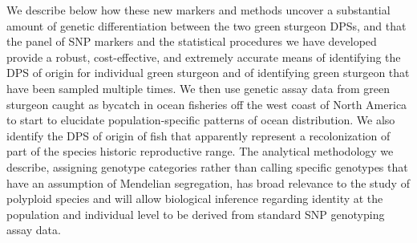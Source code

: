 We describe below how these new markers and methods uncover a substantial amount
of genetic differentiation between the two green sturgeon DPSs, and that the
panel of SNP markers and the statistical procedures we have developed provide a
robust, cost-effective, and extremely accurate means of identifying the DPS of
origin for individual green sturgeon and of identifying green sturgeon that have
been sampled multiple times. We then use genetic assay data from green sturgeon
caught as bycatch in ocean fisheries off the west coast of North America to start
to elucidate population-specific patterns of ocean distribution. We also identify
the DPS of origin of fish that apparently represent a recolonization of part of the species
historic reproductive range. The analytical methodology we describe, assigning genotype
categories rather than calling specific genotypes that have an assumption of 
Mendelian segregation, has broad relevance to the study of polyploid species 
and will allow biological inference regarding identity at the population and 
individual level to be derived from standard SNP genotyping assay data.








